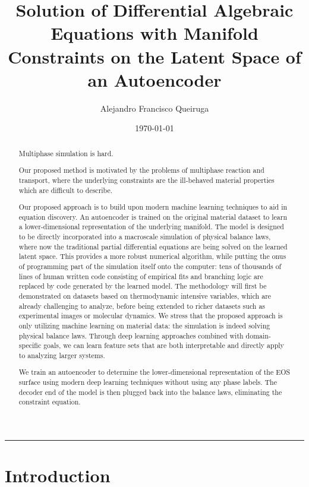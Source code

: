 \documentclass[]{article}
\title{Solution of Differential Algebraic Equations with Manifold Constraints
on the Latent Space of an Autoencoder}
\author{Alejandro Francisco Queiruga}
\date{\today}
\begin{document}
\maketitle
\begin{abstract}
  Multiphase simulation is hard.

Our
proposed method is motivated by the problems of multiphase reaction and
transport, where the underlying constraints are the ill-behaved material
properties which are difficult to describe.
  
Our proposed approach is to build upon modern machine learning
techniques to aid in equation discovery. An autoencoder is trained on
the original material dataset to learn a lower-dimensional
representation of the underlying manifold. The model is designed to be
directly incorporated into a macroscale simulation of physical balance
laws, where now the traditional partial differential equations are being
solved on the learned latent space. This provides a more robust
numerical algorithm, while putting the onus of programming part of the
simulation itself onto the computer: tens of thousands of lines of human
written code consisting of empirical fits and branching logic are
replaced by code generated by the learned model. The methodology will
first be demonstrated on datasets based on thermodynamic intensive
variables, which are already challenging to analyze, before being
extended to richer datasets such as experimental images or molecular
dynamics. We stress that the proposed approach is only utilizing machine
learning on material data: the simulation is indeed solving physical
balance laws. Through deep learning approaches combined with
domain-specific goals, we can learn feature sets that are both
interpretable and directly apply to analyzing larger systems.
  
We train an autoencoder to determine the lower-dimensional
representation of the EOS surface using modern deep learning techniques
without using any phase labels. The decoder end of the model is then
plugged back into the balance laws, eliminating the constraint equation.
\end{abstract}

\begin{center}\rule{0.5\linewidth}{\linethickness}\end{center}

\hypertarget{header-n3216}{%
\section{Introduction}\label{header-n3216}}
\end{document}
